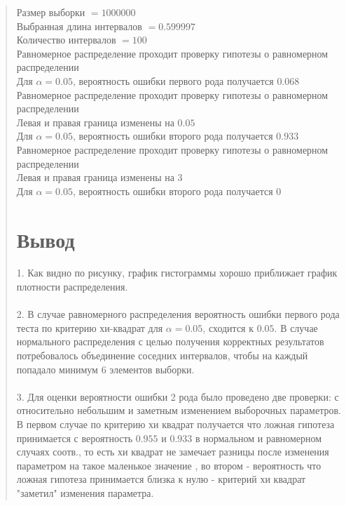 \documentclass{article}
\begin{document}
\begin{quote}
	Размер выборки $= 1000000$ \\
	Выбранная длина интервалов $= 0.599997$ \\
	Количество интервалов $= 100$ \\

	Равномерное распределение проходит проверку гипотезы о равномерном распределении \\
	Для $\alpha = 0.05$, вероятность ошибки первого рода получается $0.068$ \\

	Равномерное распределение проходит проверку гипотезы о равномерном распределении \\ 
	Левая и правая граница изменены на $0.05$ \\
	Для $\alpha = 0.05$, вероятность ошибки второго рода получается $0.933$ \\

	Равномерное распределение проходит проверку гипотезы о равномерном распределении \\
	Левая и правая граница изменены на $3$ \\
	Для $\alpha = 0.05$, вероятность ошибки второго рода получается $0$
\section{Вывод}
	1. Как видно по рисунку, график гистограммы хорошо приближает график плотности распределения. \\ \\
	2. В случае равномерного распределения вероятность ошибки первого рода теста по критерию хи-квадрат для $\alpha = 0.05$, сходится к $0.05$. В случае нормального распределения с целью получения корректных результатов потребовалось объединение соседних интервалов, чтобы на каждый попадало минимум 6 элементов выборки. \\ \\
	3. Для оценки вероятности ошибки 2 рода было проведено две проверки: с относительно небольшим и заметным изменением выборочных параметров. В первом случае по критерию хи квадрат получается что ложная гипотеза принимается с вероятность $0.955$ и $0.933$ в нормальном и равномерном случаях соотв., то есть хи квадрат не замечает разницы после изменения параметром на такое маленькое значение , во втором - вероятность что ложная гипотеза принимается близка к нулю - критерий хи квадрат "заметил" изменения параметра.


\end{quote}
\end{document}
